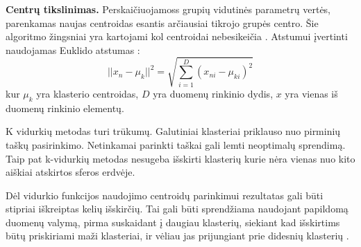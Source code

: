  \textbf{Centrų tikslinimas.} Perskaičiuojamoss grupių vidutinės parametrų vertės, parenkamas naujas centroidas esantis arčiausiai tikrojo grupės centro.
 Šie algoritmo žingsniai yra kartojami kol centroidai nebesikeičia \cite{Wu2008}. Atstumui įvertinti naudojamas Euklido atstumas \cite{comp}:
   \begin{equation}
   ||x_n - \mu_k||^2 = \sqrt{\sum_{i=1}^{D}(x_{ni} - \mu_{ki})^2}
   \end{equation}
   kur $\mu_k$ yra klasterio centroidas, $D$ yra duomenų rinkinio dydis, $x$ yra vienas iš duomenų rinkinio elementų.

   K vidurkių metodas turi trūkumų. Galutiniai klasteriai priklauso nuo pirminių taškų pasirinkimo. Netinkamai parinkti taškai gali lemti neoptimalų sprendimą. Taip pat k-vidurkių metodas nesugeba išskirti klasterių kurie nėra vienas nuo kito aiškiai atskirtos sferos erdvėje.

   Dėl vidurkio funkcijos naudojimo centroidų parinkimui rezultatas gali būti stipriai iškreiptas kelių išskirčių. Tai gali būti sprendžiama naudojant papildomą duomenų valymą, pirma suskaidant į daugiau klasterių, siekiant kad išskirtims būtų priskiriami maži klasteriai, ir vėliau jas prijungiant prie didesnių klasterių \cite{Wu2008}.


